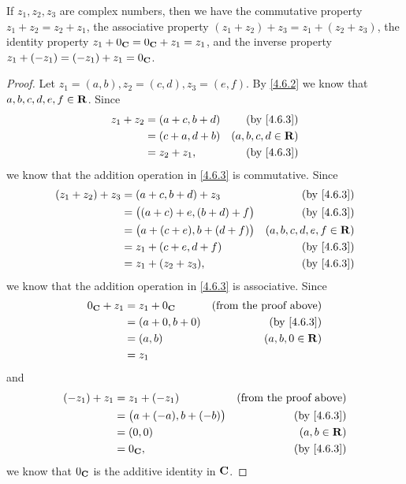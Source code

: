 \begin{lemma}\label{4.6.4}
  If \(z_1, z_2, z_3\) are complex numbers, then we have the commutative property \(z_1 + z_2 = z_2 + z_1\), the associative property \((z_1 + z_2) + z_3 = z_1 + (z_2 + z_3)\), the identity property \(z_1 + 0_{\mathbf{C}} = 0_{\mathbf{C}} + z_1 = z_1\), and the inverse property \(z_1 + (-z_1) = (-z_1) + z_1 = 0_{\mathbf{C}}\).
\end{lemma}

\begin{proof}
  Let \(z_1 = (a, b), z_2 = (c, d), z_3 = (e, f)\).
  By \cref{4.6.2} we know that \(a, b, c, d, e, f \in \mathbf{R}\).
  Since
  \begin{align*}
    z_1 + z_2 & = (a + c, b + d) & \text{(by \cref{4.6.3})} \\
              & = (c + a, d + b) & (a, b, c, d \in \R)      \\
              & = z_2 + z_1,     & \text{(by \cref{4.6.3})}
  \end{align*}
  we know that the addition operation in \cref{4.6.3} is commutative.
  Since
  \begin{align*}
    (z_1 + z_2) + z_3 & = (a + c, b + d) + z_3               & \text{(by \cref{4.6.3})}  \\
                      & = \big((a + c) + e, (b + d) + f\big) & \text{(by \cref{4.6.3})}  \\
                      & = \big(a + (c + e), b + (d + f)\big) & (a, b, c, d, e, f \in \R) \\
                      & = z_1 + (c + e, d + f)               & \text{(by \cref{4.6.3})}  \\
                      & = z_1 + (z_2 + z_3),                 & \text{(by \cref{4.6.3})}
  \end{align*}
  we know that the addition operation in \cref{4.6.3} is associative.
  Since
  \begin{align*}
    0_{\C} + z_1 & = z_1 + 0_{\C}   & \text{(from the proof above)} \\
                 & = (a + 0, b + 0) & \text{(by \cref{4.6.3})}      \\
                 & = (a, b)         & (a, b, 0 \in \R)              \\
                 & = z_1
  \end{align*}
  and
  \begin{align*}
    (-z_1) + z_1 & = z_1 + (-z_1)                 & \text{(from the proof above)} \\
                 & = \big(a + (-a), b + (-b)\big) & \text{(by \cref{4.6.3})}      \\
                 & = (0, 0)                       & (a, b \in \R)                 \\
                 & = 0_{\C},                      & \text{(by \cref{4.6.3})}
  \end{align*}
  we know that \(0_{\mathbf{C}}\) is the additive identity in \(\mathbf{C}\).
\end{proof}

